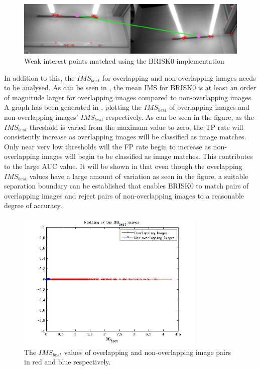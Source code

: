 \documentclass[11pt]{report}
\begin{document}
 
\begin{figure}
  \centering
    \includegraphics[width=1.0\textwidth]{../Drawings/Matching/weakInterestPointMatch.jpg}
    \caption{Weak interest points matched using the BRISK0 implementation} 
    \label{fig:weakMatch}
\end{figure}

In addition to this, the $IMS_{best}$ for overlapping and non-overlapping images needs to be analysed. As can be seen in , the mean IMS for BRISK0 is at least an order of magnitude larger for overlapping images compared to non-overlapping images. A graph has been generated in , plotting the $IMS_{best}$ of overlapping images and non-overlapping images' $IMS_{best}$ respectively. As can be seen in the figure, as the $IMS_{best}$ threshold is varied from the maximum value to zero, the TP rate will consistently increase as overlapping images will be classified as image matches. Only near very low thresholds will the FP rate begin to increase as non-overlapping images will begin to be classified as image matches. This contributes to the large AUC value. It will be shown in  that even though the overlapping $IMS_{best}$ values have a large amount of variation as seen in the figure, a suitable separation boundary can be established that enables BRISK0 to match pairs of overlapping images and reject pairs of non-overlapping images to a reasonable degree of accuracy.\\

\begin{figure}
  \centering
    \includegraphics[width=0.8\textwidth]{../Drawings/Matching/MatchingScore_BRISK0.jpg}
    \caption{The $IMS_{best}$ values of overlapping and non-overlapping image pairs in red and blue respectively.} 
    \label{fig:ms_brisk0}
\end{figure}
\end{document}
